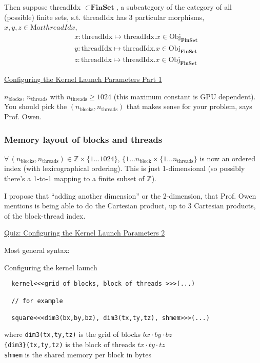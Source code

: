 \documentclass[10pt]{amsart}
\begin{document}
\begin{multicols*}{2}
Then suppose threadIdx $\subset \mathbf{\text{FinSet}}$, a subcategory of the category of all (possible) finite sets, s.t. threadIdx has 3 particular morphisms, $x,y,z\in \text{Mor}threadIdx$,
\[
\begin{aligned}
  & x : \text{threadIdx} \mapsto \text{threadIdx}.x \in \text{Obj}_{\mathbf{\text{FinSet}}} \\ 
  & y : \text{threadIdx} \mapsto \text{threadIdx}.x \in \text{Obj}_{\mathbf{\text{FinSet}}} \\ 
  & z : \text{threadIdx} \mapsto \text{threadIdx}.x \in \text{Obj}_{\mathbf{\text{FinSet}}}  
\end{aligned}
\]

\href{https://classroom.udacity.com/courses/cs344/lessons/55120467/concepts/670742980923}{Configuring the Kernel Launch Parameters Part 1}

$n_{\text{blocks}}$, $n_{\text{threads}}$ with $n_{\text{threads}} \geq 1024$ (this maximum constant is GPU dependent).  You should pick the $(n_{\text{blocks}}, n_{\text{threads}})$ that makes sense for your problem, says Prof. Owen.  

\subsubsection{Memory layout of blocks and threads}

$\forall \, (n_{\text{blocks}}, n_{\text{threads}}) \in \mathbb{Z} \times \lbrace 1 \dots 1024 \rbrace$, $\lbrace 1 \dots n_{\text{block}} \times \lbrace 1 \dots n_{\text{threads}} \rbrace$ is now an ordered index (with lexicographical ordering).  This is just 1-dimensional (so possibly there's a 1-to-1 mapping to a finite subset of $\mathbb{Z}$).

I propose that ``adding another dimension'' or the 2-dimension, that Prof. Owen mentions is being able to do the Cartesian product, up to 3 Cartesian products, of the block-thread index.  

\href{https://classroom.udacity.com/courses/cs344/lessons/55120467/concepts/668398860923}{Quiz: Configuring the Kernel Launch Parameters 2 }

Most general syntax:

Configuring the kernel launch
\begin{lstlisting}
  kernel<<<grid of blocks, block of threads >>>(...)

  // for example

  square<<<dim3(bx,by,bz), dim3(tx,ty,tz), shmem>>>(...)
  \end{lstlisting}
where \verb|dim3(tx,ty,tz)| is the grid of blocks $bx\cdot by \cdot bz$ \\
\phantom{ where } \verb|{dim3}(tx,ty,tz)| is the block of threads $tx \cdot ty \cdot tz$ \\
\phantom{ where } \verb|shmem| is the shared memory per block in bytes



\end{multicols*}
\end{document}
